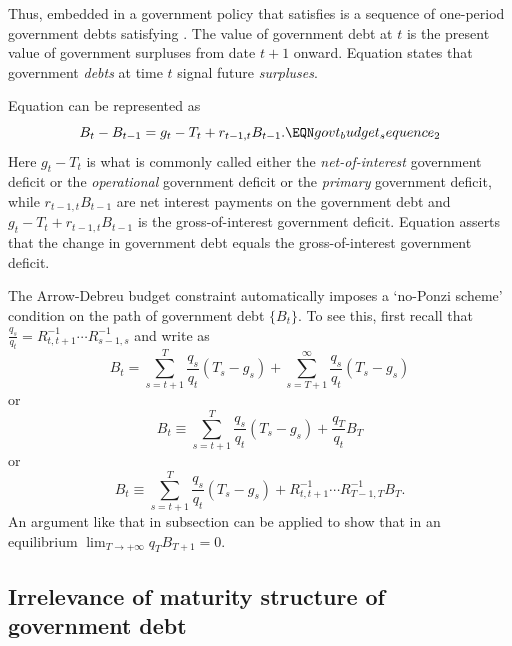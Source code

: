 Thus, embedded in a government  policy that satisfies  is a sequence of one-period
government debts satisfying . The value of government debt at $t$ is the present value
of government surpluses from date $t+1$ onward. Equation  states that government {\it debts\/}
at time $t$ signal future {\it surpluses\/}.

Equation  can be represented as
$$
B_t - B_{t-1} = g_t - T_t + r_{t-1,t} B_{t-1}. \EQN govt_budget_sequence_2
$$
Here $g_t - T_t$ is what is commonly called  either the {\it net-of-interest\/} government deficit
or the {\it operational\/} government deficit or the {\it primary\/} government deficit, while $r_{t-1,t} B_{t-1}$ are net interest payments on the government
debt and  $ g_t - T_t + r_{t-1,t} B_{t-1}$ is the gross-of-interest government deficit.
Equation  asserts that the change in government debt equals the
gross-of-interest government deficit.
%
%
%
%

The Arrow-Debreu budget constraint  automatically imposes a `no-Ponzi scheme' condition on the path of
government debt $\{B_t\}$.
To see this, first recall that ${\frac{q_s}{q_t}} =  R_{t,t+1}^{-1} \cdots R_{s-1,s}^{-1}$ and
write  
as
$$ B_t = \sum_{s=t+1}^T {\frac{q_s}{q_t}} (T_s - g_s )+ \sum_{s=T+1}^\infty {\frac{q_s}{q_t} } (T_s - g_s ) $$
or
$$ B_t \equiv \sum_{s=t+1}^T {\frac{q_s}{q_t}} (T_s - g_s )+ {\frac{q_{T}}{q_t}}B_{T} $$
or
$$ B_t \equiv \sum_{s=t+1}^T {\frac{q_s}{q_t} } (T_s - g_s )+ R_{t,t+1}^{-1} \cdots R_{T-1,T}^{-1} B_{T}. $$
An argument like that in subsection  can be applied to show that in an equilibrium $\lim_{T \rightarrow +\infty} q_T B_{T+1} = 0$.
\subsection{Irrelevance of maturity structure of government debt}

